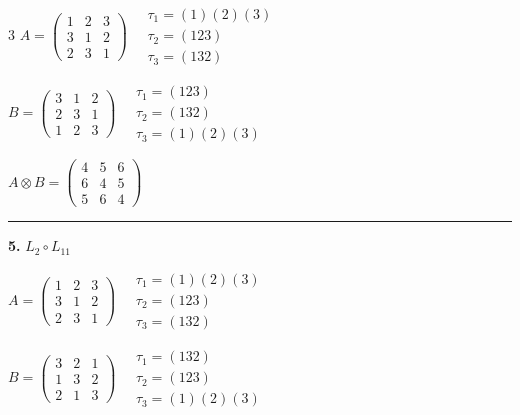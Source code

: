 \begin{multicols}{3}
$A = \begin{pmatrix} 1 & 2 & 3 \\ 3 & 1 & 2 \\ 2 & 3 & 1 \end{pmatrix} \quad \begin{matrix} \tau_{1}=(1)(2)(3) \\ \tau_{2}=(1 2 3) \\ \tau_{3}=(1 3 2) \end{matrix}$

$B = \begin{pmatrix} 3 & 1 & 2 \\ 2 & 3 & 1 \\ 1 & 2 & 3 \end{pmatrix} \quad \begin{matrix} \tau_{1}=(1 2 3) \\ \tau_{2}=(1 3 2) \\ \tau_{3}=(1)(2)(3) \end{matrix}$

$A \otimes B = \begin{pmatrix} 4 & 5 & 6 \\ 6 & 4 & 5 \\ 5 & 6 & 4 \end{pmatrix}$

\vspace{0.3em}
\hrule
\vspace{0.3em}

\noindent\textbf{5.} $L_{2} \circ L_{11}$

$A = \begin{pmatrix} 1 & 2 & 3 \\ 3 & 1 & 2 \\ 2 & 3 & 1 \end{pmatrix} \quad \begin{matrix} \tau_{1}=(1)(2)(3) \\ \tau_{2}=(1 2 3) \\ \tau_{3}=(1 3 2) \end{matrix}$

$B = \begin{pmatrix} 3 & 2 & 1 \\ 1 & 3 & 2 \\ 2 & 1 & 3 \end{pmatrix} \quad \begin{matrix} \tau_{1}=(1 3 2) \\ \tau_{2}=(1 2 3) \\ \tau_{3}=(1)(2)(3) \end{matrix}$


\end{multicols}
